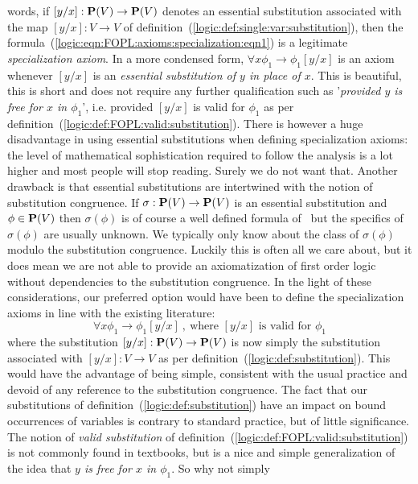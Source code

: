 words, if $[y/x]:\mbox{${\bf P}(V)$}\to\mbox{${\bf P}(V)$}$ denotes an essential substitution
associated with the map $[y/x]:V\to V$ of
definition~(\ref{logic:def:single:var:substitution}), then the
formula~(\ref{logic:eqn:FOPL:axioms:specialization:eqn1}) is a
legitimate {\em specialization axiom}. In a more condensed form,
$\forall x\phi_{1}\to\phi_{1}[y/x]$ is an axiom whenever $[y/x]$ is
an {\em essential substitution of $y$ in place of $x$}. This is
beautiful, this is short and does not require any further
qualification such as '{\em provided $y$ is free for $x$ in
$\phi_{1}$}', i.e. provided $[y/x]$ is valid for $\phi_{1}$ as per
definition~(\ref{logic:def:FOPL:valid:substitution}). There is
however a huge disadvantage in using essential substitutions when
defining specialization axioms: the level of mathematical
sophistication required to follow the analysis is a lot higher and
most people will stop reading. Surely we do not want that. Another
drawback is that essential substitutions are intertwined with the
notion of substitution congruence. If $\sigma:\mbox{${\bf P}(V)$}\to \mbox{${\bf P}(V)$}$ is an
essential substitution and $\phi\in\mbox{${\bf P}(V)$}$ then $\sigma(\phi)$ is of
course a well defined formula of \pv\ but the specifics of
$\sigma(\phi)$ are usually unknown. We typically only know about the
class of $\sigma(\phi)$ modulo the substitution congruence. Luckily
this is often all we care about, but it does mean we are not able to
provide an axiomatization of first order logic without dependencies
to the substitution congruence. In the light of these
considerations, our preferred option would have been to define the
specialization axioms in line with the existing literature:
    \begin{equation}\label{logic:eqn:FOPL:axioms:specialization:eqn2}
    \forall x\phi_{1}\to\phi_{1}[y/x]\ ,\ \mbox{where $[y/x]$ is valid for $\phi_{1}$}
    \end{equation}
where the substitution $[y/x]:\mbox{${\bf P}(V)$}\to\mbox{${\bf P}(V)$}$ is now simply the
substitution associated with $[y/x]:V\to V$ as per
definition~(\ref{logic:def:substitution}). This would have the
advantage of being simple, consistent with the usual practice and
devoid of any reference to the substitution congruence. The fact
that our substitutions of definition~(\ref{logic:def:substitution})
have an impact on bound occurrences of variables is contrary to
standard practice, but of little significance. The notion of {\em
valid substitution} of
definition~(\ref{logic:def:FOPL:valid:substitution}) is not commonly
found in textbooks, but is a nice and simple generalization of the
idea that {\em $y$ is free for $x$ in $\phi_{1}$}. So why not simply
